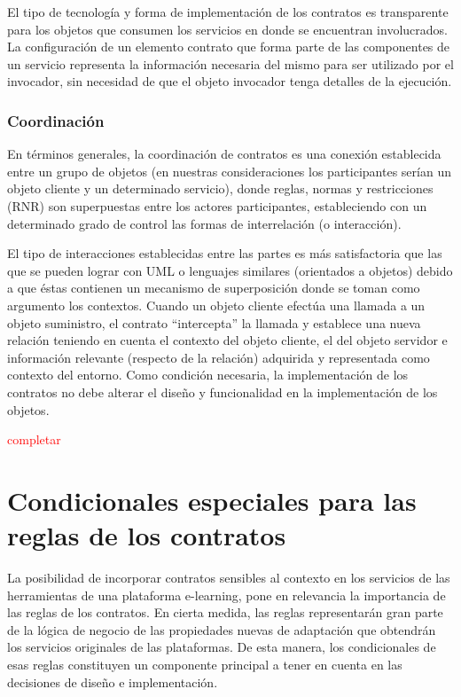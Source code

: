 \begin{itemize}
El tipo de tecnología y forma de implementación de los contratos es transparente para los objetos que consumen los servicios en donde se encuentran involucrados. La configuración de un elemento contrato que forma parte de las componentes de un servicio representa la información necesaria del mismo para ser utilizado por el invocador, sin necesidad de que el objeto invocador tenga detalles de la ejecución.


\subsubsection {Coordinación}

En términos generales, la coordinación de contratos es una conexión establecida
entre un grupo de objetos (en nuestras consideraciones los participantes
serían un objeto cliente y un determinado servicio), donde reglas, normas y
restricciones (RNR) son superpuestas entre los actores participantes, estableciendo
con un determinado grado de control las formas de interrelación (o
interacción).

El tipo de interacciones establecidas entre las partes es más satisfactoria
que las que se pueden lograr con UML o lenguajes similares (orientados a objetos)
debido a que éstas contienen un mecanismo de superposición donde se
toman como argumento los contextos. Cuando un objeto cliente efectúa una
llamada a un objeto suministro, el contrato “intercepta” la llamada y establece
una nueva relación teniendo en cuenta el contexto del objeto cliente, el
del objeto servidor e información relevante (respecto de la relación) adquirida
y representada como contexto del entorno. Como condición necesaria, la
implementación de los contratos no debe alterar el diseño y funcionalidad en
la implementación de los objetos.


\textcolor{red}{completar}



\section{Condicionales especiales para las reglas de los contratos}


La posibilidad de incorporar contratos sensibles al contexto en los servicios de las herramientas de una plataforma e-learning, pone en relevancia la importancia de las reglas de los contratos. En cierta medida, las reglas representarán gran parte de la lógica de negocio de las propiedades nuevas de adaptación que obtendrán los servicios originales de las plataformas. De esta manera, los condicionales de esas reglas constituyen un componente principal a tener en cuenta en las decisiones de diseño e implementación.


\end{itemize}
